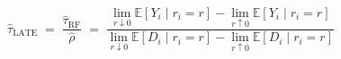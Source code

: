 \begin{equation}
    \label{eq:late_wald}
    \hat{\tau}_{\text{LATE}}
    \;=\;
    \frac{\hat{\tau}_{\text{RF}}}{\hat{\rho}}
    \;=\;
    \frac{
        \displaystyle\lim_{r \downarrow 0} \mathbb{E}[Y_i \mid r_i = r]
        -
        \displaystyle\lim_{r \uparrow 0}  \mathbb{E}[Y_i \mid r_i = r]
    }{
        \displaystyle\lim_{r \downarrow 0} \mathbb{E}[D_i \mid r_i = r]
        -
        \displaystyle\lim_{r \uparrow 0}  \mathbb{E}[D_i \mid r_i = r]
    }
\end{equation}

%
